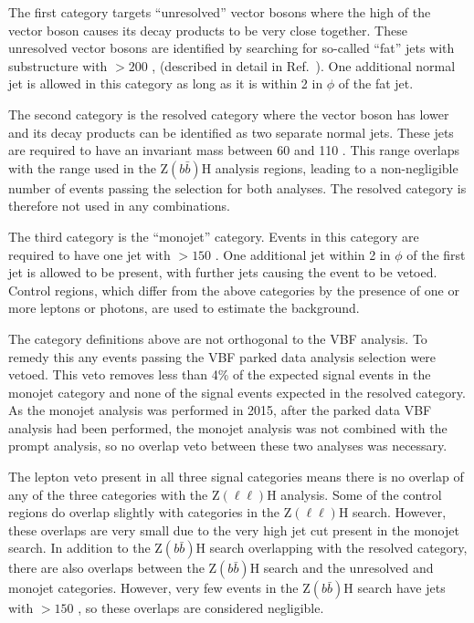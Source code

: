 The first category targets ``unresolved'' vector bosons where the high \pt of the vector boson causes its decay products to be very close together. These unresolved vector bosons are identified by searching for so-called ``fat'' jets with substructure with \pt$>200$ \GeV, (described in detail in Ref.~\cite{CMS-PAS-EXO-12-055}). One additional normal jet is allowed in this category as long as it is within 2 in $\phi$ of the fat jet.

The second category is the resolved category where the vector boson has lower \pt and its decay products can be identified as two separate normal jets. These jets are required to have an invariant mass between 60 and 110 \GeV. This range overlaps with the range used in the Z$(b\bar{b})$H analysis regions, leading to a non-negligible number of events passing the selection for both analyses. The resolved category is therefore not used in any combinations.

The third category is the ``monojet'' category. Events in this category are required to have one jet with \pt$>150$ \GeV. One additional jet within 2 in $\phi$ of the first jet is allowed to be present, with further jets causing the event to be vetoed. Control regions, which differ from the above categories by the presence of one or more leptons or photons, are used to estimate the background.

The category definitions above are not orthogonal to the \ac{VBF} analysis. To remedy this any events passing the \ac{VBF} parked data analysis selection were vetoed. This veto removes less than 4\% of the expected signal events in the monojet category and none of the signal events expected in the resolved category. As the monojet analysis was performed in 2015, after the parked data \ac{VBF} analysis had been performed, the monojet analysis was not combined with the prompt analysis, so no overlap veto between these two analyses was necessary.

The lepton veto present in all three signal categories means there is no overlap of any of the three categories with the Z$(\ell\ell)$H analysis. Some of the control regions do overlap slightly with categories in the Z$(\ell\ell)$H search. However, these overlaps are very small due to the very high jet \pt cut present in the monojet search. In addition to the Z$(b\bar{b})$H search overlapping with the resolved category, there are also overlaps between the Z$(b\bar{b})$H search and the  unresolved and monojet categories. However, very few events in the Z$(b\bar{b})$H search have jets with \pt$>150$ \GeV, so these overlaps are considered negligible.

